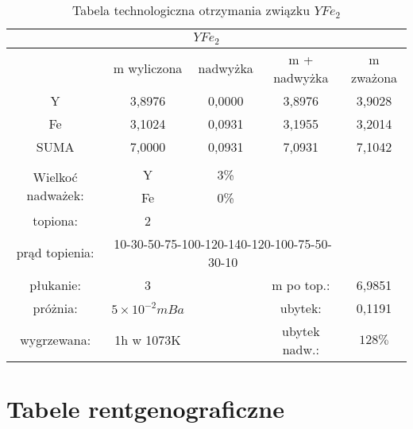 \documentclass[a4paper,12pt]{article}
\numberwithin{equation}{section}
\begin{document}
\begin{appendices}
\clearpage
\begin{table}[h]
\footnotesize
\caption{Tabela technologiczna otrzymania związku $YFe_{2}$ }
\label{Ytechno}
\begin{tabular}{|c|c|c|c|c|}
\hline
\multicolumn{5}{|c|}{$YFe_{2} $}\\\hline\hline
	& m wyliczona		&	nadwyżka	& m + nadwyżka	&	m zważona \\\hline
Y	&	3,8976	&	0,0000	&	3,8976	&	3,9028	\\\hline
Fe	&	3,1024	&	0,0931	&	3,1955	&	3,2014	\\\hline
SUMA	&	7,0000	&	0,0931	&	7,0931	&	7,1042	\\\hline
\multicolumn{5}{|c|}{}\\\cline{1-3}
\multirow{2}{*}{Wielkoć nadważek:}	
	&	Y 	&	3\%	& 	\multicolumn{2}{c|}{}\\\cline{2-3}	
	&	Fe	&	0\%	&	\multicolumn{2}{c|}{}\\\cline{1-3}
\multicolumn{1}{|c}{topiona:}	&	\multicolumn{1}{c|}{2} 	&	\multicolumn{3}{c|}{}\\\cline{1-4}
\multicolumn{1}{|c}{prąd topienia:}	&	\multicolumn{3}{c|}{10-30-50-75-100-120-140-120-100-75-50-30-10}	&	\\\cline{1-5}
\multicolumn{1}{|c}{płukanie:}	&	\multicolumn{1}{c|}{3}	&	&	\multicolumn{1}{c}{m po top.:}	&	\multicolumn{1}{c|}{6,9851} 	 	\\\cline{1-2}\cline{4-5}
\multicolumn{1}{|c}{próżnia:}	&	\multicolumn{1}{c|}{$5\times10^{-2}mBa$}	&	&	\multicolumn{1}{c}{ubytek:}	&	\multicolumn{1}{c|}{0,1191} 	 	\\\cline{1-2}\cline{4-5}
\multicolumn{1}{|c}{wygrzewana:}	&	\multicolumn{1}{c|}{1h w 1073K }	&	&	\multicolumn{1}{c}{ubytek nadw.:}	&	\multicolumn{1}{c|}{$128\%$} 	 	\\\hline
\end{tabular}
\end{table}


\clearpage
 \section{Tabele rentgenograficzne}
 

\end{appendices}
\end{document}
